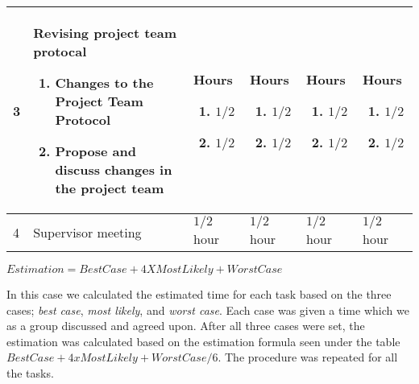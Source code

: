 \begin{left}
\begin{tabular}{ | l | p{5cm} | p{2cm} | p{2cm} | p{2cm} | p{2cm} |}
	
	3 & Revising project team protocal \begin{enumerate}
		\item Changes to the Project Team Protocol
		\item Propose and discuss changes in the project team 
	\end{enumerate} & Hours \begin{enumerate} %
		\item $1/2$
		\item $1/2$
	\end{enumerate} & Hours \begin{enumerate} %
		\item $1/2$
		\item $1/2$
	\end{enumerate} & Hours \begin{enumerate} %
		\item $1/2$
		\item $1/2$
	\end{enumerate} & Hours \begin{enumerate} %
		\item $1/2$
		\item $1/2$		
	\end{enumerate} \\ \hline 
	
	4 & Supervisor meeting & $1/2$ hour & $1/2$ hour & $1/2$ hour & $1/2$ hour
	\\
    \hline
    \end{tabular}
\end{left}


$Estimation =Best Case +4XMost Likely+Worst Case$


In this case we calculated the estimated time for each task based on the three cases; \textit{best case}, \textit{most likely}, and \textit{worst case}. Each case was given a time which we as a group discussed and agreed upon. After all three cases were set, the estimation was calculated based on the estimation formula seen under the table $BestCase + 4 x MostLikely + WorstCase / 6$. The procedure was repeated for all the tasks.

